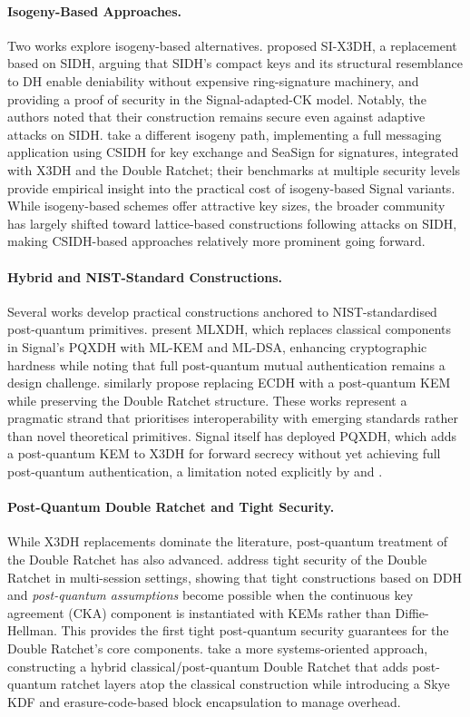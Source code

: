 \paragraph{Isogeny-Based Approaches.}
Two works explore isogeny-based alternatives. \textcite{dobson2022} proposed SI-X3DH, a replacement based on SIDH, arguing that SIDH's compact keys and its structural resemblance to DH enable deniability without expensive ring-signature machinery, and providing a proof of security in the Signal-adapted-CK model. Notably, the authors noted that their construction remains secure even against adaptive attacks on SIDH. \textcite{jankowski2025} take a different isogeny path, implementing a full messaging application using CSIDH for key exchange and SeaSign for signatures, integrated with X3DH and the Double Ratchet; their benchmarks at multiple security levels provide empirical insight into the practical cost of isogeny-based Signal variants. While isogeny-based schemes offer attractive key sizes, the broader community has largely shifted toward lattice-based constructions following attacks on SIDH, making CSIDH-based approaches relatively more prominent going forward.

\paragraph{Hybrid and NIST-Standard Constructions.}
Several works develop practical constructions anchored to NIST-standardised post-quantum primitives. \textcite{angom2025} present MLXDH, which replaces classical components in Signal's PQXDH with ML-KEM and ML-DSA, enhancing cryptographic hardness while noting that full post-quantum mutual authentication remains a design challenge. \textcite{sharma2023} similarly propose replacing ECDH with a post-quantum KEM while preserving the Double Ratchet structure. These works represent a pragmatic strand that prioritises interoperability with emerging standards rather than novel theoretical primitives. Signal itself has deployed PQXDH, which adds a post-quantum KEM to X3DH for forward secrecy without yet achieving full post-quantum authentication, a limitation noted explicitly by \textcite{niot2025} and \textcite{angom2025}.

\paragraph{Post-Quantum Double Ratchet and Tight Security.}
While X3DH replacements dominate the literature, post-quantum treatment of the Double Ratchet has also advanced. \textcite{collins2024} address tight security of the Double Ratchet in multi-session settings, showing that tight constructions based on DDH and \emph{post-quantum assumptions} become possible when the continuous key agreement (CKA) component is instantiated with KEMs rather than Diffie-Hellman. This provides the first tight post-quantum security guarantees for the Double Ratchet's core components. \textcite{guo2025} take a more systems-oriented approach, constructing a hybrid classical/post-quantum Double Ratchet that adds post-quantum ratchet layers atop the classical construction while introducing a Skye KDF and erasure-code-based block encapsulation to manage overhead.

